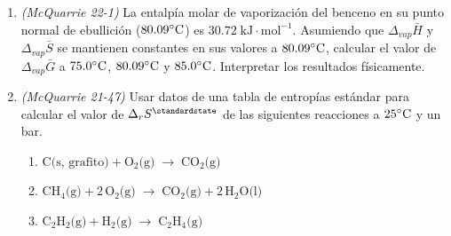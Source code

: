 \documentclass[a4paper,12pt]{article}
\begin{document}
\begin{enumerate}
 \item \textit{(McQuarrie 22-1)} La entalp\'ia molar de vaporizaci\'on del benceno en su punto normal de ebullici\'on ($80.09\celsius$) es $30.72\;\mbox{kJ}\cdot\mbox{mol}^{-1}$. Asumiendo que $\Delta_{vap}\bar{H}$ y $\Delta_{vap}\bar{S}$ se mantienen constantes en sus valores a $80.09\celsius$, calcular el valor de $\Delta_{vap}\bar{G}$ a $75.0\celsius$, $80.09\celsius$ y $85.0\celsius$. Interpretar los resultados f\'isicamente. %

 \item \textit{(McQuarrie 21-47)} Usar datos de una tabla de entrop\'ias est\'andar para calcular el valor de $\Delta_rS^\standardstate$ de las siguientes reacciones a $25\celsius$ y un bar.
 \begin{enumerate}
  \item $\mbox{C(s, grafito)}+\mbox{O}_2\mbox{(g)}\;\rightarrow\;\mbox{CO}_2\mbox{(g)}$
  \item $\mbox{CH}_4\mbox{(g)}+2\,\mbox{O}_2\mbox{(g)}\;\rightarrow\;\mbox{CO}_2\mbox{(g)}+2\,\mbox{H}_2\mbox{O(l)}$
  \item $\mbox{C}_2\mbox{H}_2\mbox{(g)}+\mbox{H}_2\mbox{(g)}\;\rightarrow\;\mbox{C}_2\mbox{H}_4\mbox{(g)}$
 \end{enumerate} %

\end{enumerate}
 
\end{document}
